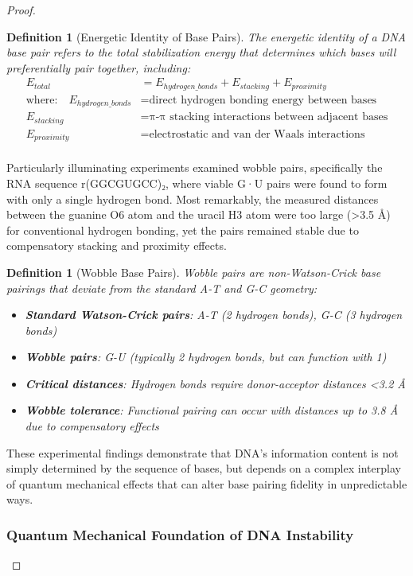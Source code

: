\documentclass[12pt,a4paper]{article}
\newtheorem{definition}[theorem]{Definition}
\begin{document}
\begin{proof}
\begin{definition}[Energetic Identity of Base Pairs]
The energetic identity of a DNA base pair refers to the total stabilization energy that determines which bases will preferentially pair together, including:
\begin{align}
E_{total} &= E_{hydrogen\_bonds} + E_{stacking} + E_{proximity} \\
\text{where:} \quad E_{hydrogen\_bonds} &= \text{direct hydrogen bonding energy between bases} \\
E_{stacking} &= \text{π-π stacking interactions between adjacent bases} \\
E_{proximity} &= \text{electrostatic and van der Waals interactions}\\
\end{align}
\end{definition}

Particularly illuminating experiments examined wobble pairs, specifically the RNA sequence r(GGCGUGCC)₂, where viable G·U pairs were found to form with only a single hydrogen bond. Most remarkably, the measured distances between the guanine O6 atom and the uracil H3 atom were too large (>3.5 Å) for conventional hydrogen bonding, yet the pairs remained stable due to compensatory stacking and proximity effects.

\begin{definition}[Wobble Base Pairs]
Wobble pairs are non-Watson-Crick base pairings that deviate from the standard A-T and G-C geometry:
\begin{itemize}
\item \textbf{Standard Watson-Crick pairs}: A-T (2 hydrogen bonds), G-C (3 hydrogen bonds)
\item \textbf{Wobble pairs}: G-U (typically 2 hydrogen bonds, but can function with 1)
\item \textbf{Critical distances}: Hydrogen bonds require donor-acceptor distances <3.2 Å
\item \textbf{Wobble tolerance}: Functional pairing can occur with distances up to 3.8 Å due to compensatory effects
\end{itemize}
\end{definition}

These experimental findings demonstrate that DNA's information content is not simply determined by the sequence of bases, but depends on a complex interplay of quantum mechanical effects that can alter base pairing fidelity in unpredictable ways.

\subsubsection{Quantum Mechanical Foundation of DNA Instability}


\end{proof}
\end{document}
